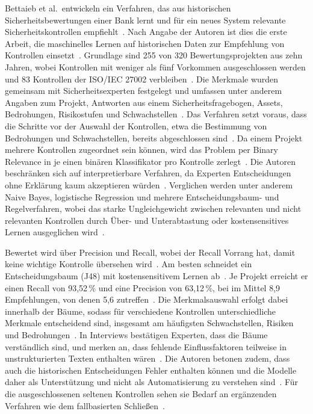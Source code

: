 Bettaieb et al.\ entwickeln ein Verfahren, das aus historischen Sicherheitsbewertungen einer Bank lernt und für ein neues System relevante Sicherheitskontrollen empfiehlt~\cite[S.~2550]{Bettaieb2020}.
Nach Angabe der Autoren ist dies die erste Arbeit, die maschinelles Lernen auf historischen Daten zur Empfehlung von Kontrollen einsetzt~\cite[S.~2556]{Bettaieb2020}.
Grundlage sind 255 von 320 Bewertungsprojekten aus zehn Jahren, wobei Kontrollen mit weniger als fünf Vorkommen ausgeschlossen werden und 83 Kontrollen der ISO/IEC 27002 verbleiben~\cite[S.~2564]{Bettaieb2020}.
Die Merkmale wurden gemeinsam mit Sicherheitsexperten festgelegt und umfassen unter anderem Angaben zum Projekt, Antworten aus einem Sicherheitsfragebogen, Assets, Bedrohungen, Risikostufen und Schwachstellen~\cite[S.~2561--2563]{Bettaieb2020}.
Das Verfahren setzt voraus, dass die Schritte vor der Auswahl der Kontrollen, etwa die Bestimmung von Bedrohungen und Schwachstellen, bereits abgeschlossen sind~\cite[S.~2559]{Bettaieb2020}.
Da einem Projekt mehrere Kontrollen zugeordnet sein können, wird das Problem per Binary Relevance in je einen binären Klassifikator pro Kontrolle zerlegt~\cites[S.~2553--2554]{Bettaieb2020}[S.~2561]{Bettaieb2020}.
Die Autoren beschränken sich auf interpretierbare Verfahren, da Experten Entscheidungen ohne Erklärung kaum akzeptieren würden~\cite[S.~2561--2563]{Bettaieb2020}.
Verglichen werden unter anderem Naive Bayes, logistische Regression und mehrere Entscheidungsbaum- und Regelverfahren, wobei das starke Ungleichgewicht zwischen relevanten und nicht relevanten Kontrollen durch Über- und Unterabtastung oder kostensensitives Lernen ausgeglichen wird~\cites[S.~2554]{Bettaieb2020}[S.~2564--2565]{Bettaieb2020}.

Bewertet wird über Precision und Recall, wobei der Recall Vorrang hat, damit keine wichtige Kontrolle übersehen wird~\cite[S.~2566]{Bettaieb2020}.
Am besten schneidet ein Entscheidungsbaum (J48) mit kostensensitivem Lernen ab~\cite[S.~2570]{Bettaieb2020}.
Je Projekt erreicht er einen Recall von 93,52\,\% und eine Precision von 63,12\,\%, bei im Mittel 8,9 Empfehlungen, von denen 5,6 zutreffen~\cite[S.~2571]{Bettaieb2020}.
Die Merkmalsauswahl erfolgt dabei innerhalb der Bäume, sodass für verschiedene Kontrollen unterschiedliche Merkmale entscheidend sind, insgesamt am häufigsten Schwachstellen, Risiken und Bedrohungen~\cite[S.~2570--2571]{Bettaieb2020}.
In Interviews bestätigen Experten, dass die Bäume verständlich sind, und merken an, dass fehlende Einflussfaktoren teilweise in unstrukturierten Texten enthalten wären~\cite[S.~2572--2575]{Bettaieb2020}.
Die Autoren betonen zudem, dass auch die historischen Entscheidungen Fehler enthalten können und die Modelle daher als Unterstützung und nicht als Automatisierung zu verstehen sind~\cite[S.~2576]{Bettaieb2020}.
Für die ausgeschlossenen seltenen Kontrollen sehen sie Bedarf an ergänzenden Verfahren wie dem fallbasierten Schließen~\cite[S.~2552, 2577]{Bettaieb2020}.

